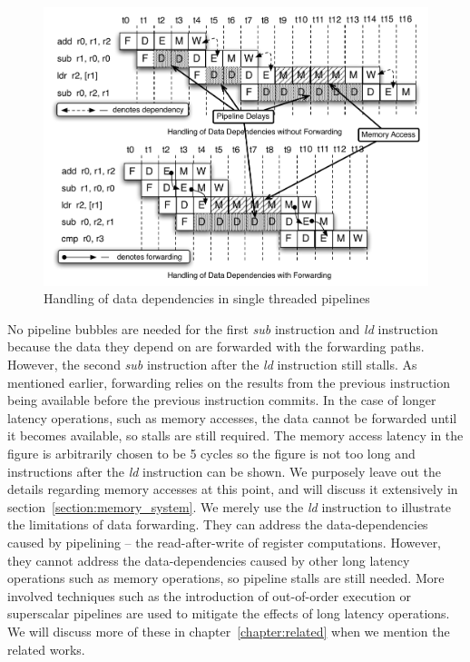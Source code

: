 \begin{figure}
\vspace{-20pt}
\begin{center}
\includegraphics[scale=.6]{figs/data_depend_execution_non_interleaved}
\end{center}
\vspace{-10pt}
\caption{Handling of data dependencies in single threaded pipelines}
\label{fig:data_depend_execution_non_interleaved}
\end{figure}
No pipeline bubbles are needed for the first \emph{sub} instruction and \emph{ld} instruction because the data they depend on are forwarded with the forwarding paths.
However, the second \emph{sub} instruction after the \emph{ld} instruction still stalls. 
As mentioned earlier, forwarding relies on the results from the previous instruction being available before the previous instruction commits. 
In the case of longer latency operations, such as memory accesses, the data cannot be forwarded until it becomes available, so stalls are still required.
The memory access latency in the figure is arbitrarily chosen to be 5 cycles so the figure is not too long and instructions after the \emph{ld} instruction can be shown.  
We purposely leave out the details regarding memory accesses at this point, and will discuss it extensively in section~\ref{section:memory_system}.
We merely use the \emph{ld} instruction to illustrate the limitations of data forwarding.
They can address the data-dependencies caused by pipelining -- the read-after-write of register computations. 
However, they cannot address the data-dependencies caused by other long latency operations such as memory operations, so pipeline stalls are still needed.
More involved techniques such as the introduction of out-of-order execution or superscalar pipelines are used to mitigate the effects of long latency operations. 
We will discuss more of these in chapter~\ref{chapter:related} when we mention the related works.  

